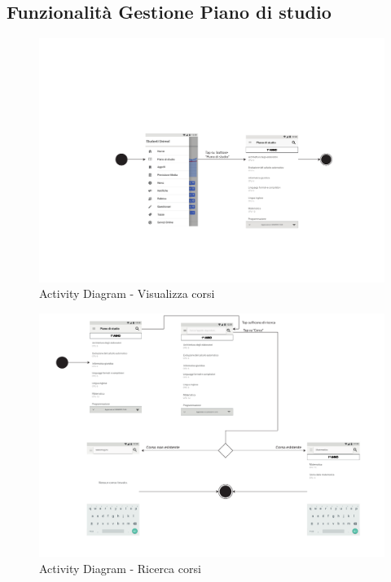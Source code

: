 \subsection{Funzionalità Gestione Piano di studio}
\begin{figure}
	\centering
	\includegraphics[width=6in]{imgs/gruppo1/activity_diagrams/AD1_Visualizza_corsi.pdf}
	\caption{Activity Diagram - Visualizza corsi}
	\label{diag:visualizzaCorsiAD}
\end{figure}
\newpage

\begin{figure}
	\centering
	\includegraphics[width=6in]{imgs/gruppo1/activity_diagrams/AD2_ricerca_corsi.pdf}
	\caption{Activity Diagram - Ricerca corsi}
	\label{diag:ricercaCorsiAD}
\end{figure}
\newpage


